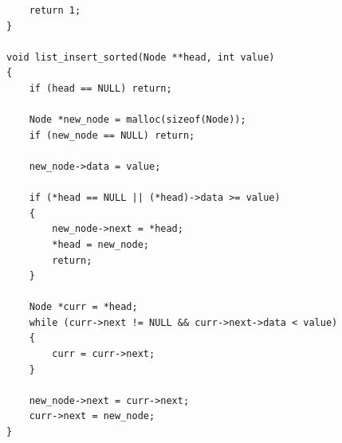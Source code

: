 \documentclass[10pt, a4paper]{article}
\begin{document}
\begin{lstlisting}
    return 1;
}

void list_insert_sorted(Node **head, int value) 
{
    if (head == NULL) return;

    Node *new_node = malloc(sizeof(Node));
    if (new_node == NULL) return;
    
    new_node->data = value;

    if (*head == NULL || (*head)->data >= value) 
    {
        new_node->next = *head;
        *head = new_node;
        return;
    }

    Node *curr = *head;
    while (curr->next != NULL && curr->next->data < value) 
    {
        curr = curr->next;
    }
    
    new_node->next = curr->next;
    curr->next = new_node;
}

\end{lstlisting}
\end{document}
